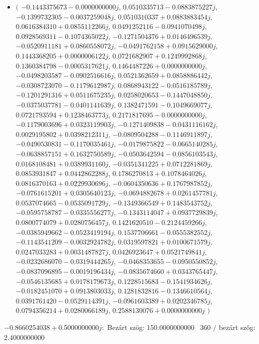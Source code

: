 \documentclass[14pt,a4paper]{article}
\begin{document}
\begin{itemize}
\item
$\big($
$-0.1443375673-0.0000000000j$, $0.0510335713-0.0883875227j$, $-0.1399732305-0.0037259048j$, $0.0510310337+0.0883883454j$, $0.0616384310+0.0855112266j$, $0.0491252116-0.0941070498j$, $0.0928569311-0.1074365022j$, $-0.1271504376+0.0146496539j$, $-0.0520911181+0.0860558072j$, $-0.0491762158+0.0915629000j$, $0.1443368205+0.0000006122j$, $0.0721682907+0.1249992868j$, $0.1360384798-0.0005317621j$, $0.1464487226+0.0000000000j$, $-0.0498203587-0.0902516616j$, $0.0521362659+0.0858886442j$, $-0.0308723070-0.1179612987j$, $0.0868943122-0.0516185789j$, $-0.1201291316+0.0511675235j$, $0.0258020653-0.1447048850j$, $-0.0375037781-0.0401141639j$, $0.1382471591-0.1049669077j$, $0.0721793594+0.1238463773j$, $0.2171817695-0.0000000000j$, $-0.1179003696+0.0323119903j$, $-0.1271409838-0.0431116162j$, $0.0029195802+0.0398212311j$, $-0.0809504288-0.1146911897j$, $-0.0490530831-0.1170035461j$, $-0.0179875822-0.0665140285j$, $-0.0638857151+0.1632750589j$, $-0.0503642594-0.0856103543j$, $0.0168108481+0.0389931160j$, $-0.0351341225+0.0712281869j$, $0.0853931847+0.0442862288j$, $0.1786270813+0.1078464026j$, $0.0816370163+0.0229930696j$, $-0.0604350636+0.1767987852j$, $-0.0761615201+0.0305640123j$, $-0.0694882678+0.0261457781j$, $0.0537074665-0.0535091729j$, $-0.1349366549+0.1483543752j$, $-0.0595758787-0.0335556277j$, $-0.1343114047+0.0937729839j$, $0.0800774079+0.0280756457j$, $0.1421620510-0.2124459266j$, $-0.0385949662-0.0523419194j$, $0.1537706661-0.0555382552j$, $-0.1143541209-0.0032924782j$, $0.0319597821+0.0100671579j$, $0.0247033283+0.0031487827j$, $0.0426923647+0.0521749841j$, $-0.0232686070-0.0319444265j$, $-0.0468353655-0.0950550852j$, $-0.0837096895-0.0019196434j$, $-0.0835674660+0.0343765447j$, $-0.0546135685+0.0178179673j$, $0.1228515683-0.1541934626j$, $-0.0182451070+0.0913803033j$, $0.1281832816-0.1346610564j$, $0.0391761420-0.0529114391j$, $-0.0961603389+0.0202346785j$, $0.0794356214+0.0280066189j$, $0.2588130076+0.0000000000j$
$\big)$
\end{itemize}
$-0.8660254038+0.5000000000j$:\
Bezárt szög: $150.0000000000$ \
360 / bezárt szög: $2.4000000000$\
\end{document}
